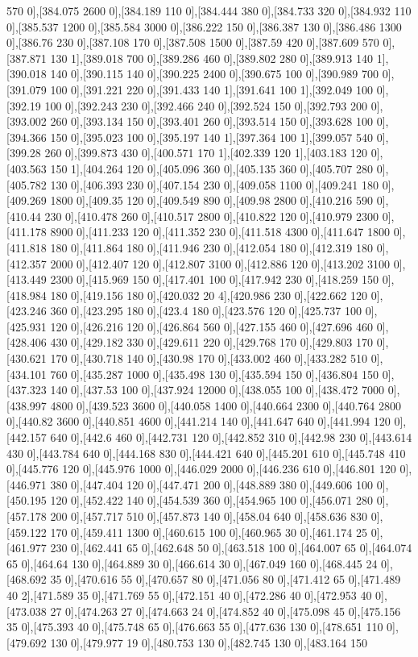 {570 0],[384.075 2600 0],[384.189 110 0],[384.444 380 0],[384.733 320 0],[384.932 110 0],[385.537 1200 0],[385.584 3000 0],[386.222 150 0],[386.387 130 0],[386.486 1300 0],[386.76 230 0],[387.108 170 0],[387.508 1500 0],[387.59 420 0],[387.609 570 0],[387.871 130 1],[389.018 700 0],[389.286 460 0],[389.802 280 0],[389.913 140 1],[390.018 140 0],[390.115 140 0],[390.225 2400 0],[390.675 100 0],[390.989 700 0],[391.079 100 0],[391.221 220 0],[391.433 140 1],[391.641 100 1],[392.049 100 0],[392.19 100 0],[392.243 230 0],[392.466 240 0],[392.524 150 0],[392.793 200 0],[393.002 260 0],[393.134 150 0],[393.401 260 0],[393.514 150 0],[393.628 100 0],[394.366 150 0],[395.023 100 0],[395.197 140 1],[397.364 100 1],[399.057 540 0],[399.28 260 0],[399.873 430 0],[400.571 170 1],[402.339 120 1],[403.183 120 0],[403.563 150 1],[404.264 120 0],[405.096 360 0],[405.135 360 0],[405.707 280 0],[405.782 130 0],[406.393 230 0],[407.154 230 0],[409.058 1100 0],[409.241 180 0],[409.269 1800 0],[409.35 120 0],[409.549 890 0],[409.98 2800 0],[410.216 590 0],[410.44 230 0],[410.478 260 0],[410.517 2800 0],[410.822 120 0],[410.979 2300 0],[411.178 8900 0],[411.233 120 0],[411.352 230 0],[411.518 4300 0],[411.647 1800 0],[411.818 180 0],[411.864 180 0],[411.946 230 0],[412.054 180 0],[412.319 180 0],[412.357 2000 0],[412.407 120 0],[412.807 3100 0],[412.886 120 0],[413.202 3100 0],[413.449 2300 0],[415.969 150 0],[417.401 100 0],[417.942 230 0],[418.259 150 0],[418.984 180 0],[419.156 180 0],[420.032 20 4],[420.986 230 0],[422.662 120 0],[423.246 360 0],[423.295 180 0],[423.4 180 0],[423.576 120 0],[425.737 100 0],[425.931 120 0],[426.216 120 0],[426.864 560 0],[427.155 460 0],[427.696 460 0],[428.406 430 0],[429.182 330 0],[429.611 220 0],[429.768 170 0],[429.803 170 0],[430.621 170 0],[430.718 140 0],[430.98 170 0],[433.002 460 0],[433.282 510 0],[434.101 760 0],[435.287 1000 0],[435.498 130 0],[435.594 150 0],[436.804 150 0],[437.323 140 0],[437.53 100 0],[437.924 12000 0],[438.055 100 0],[438.472 7000 0],[438.997 4800 0],[439.523 3600 0],[440.058 1400 0],[440.664 2300 0],[440.764 2800 0],[440.82 3600 0],[440.851 4600 0],[441.214 140 0],[441.647 640 0],[441.994 120 0],[442.157 640 0],[442.6 460 0],[442.731 120 0],[442.852 310 0],[442.98 230 0],[443.614 430 0],[443.784 640 0],[444.168 830 0],[444.421 640 0],[445.201 610 0],[445.748 410 0],[445.776 120 0],[445.976 1000 0],[446.029 2000 0],[446.236 610 0],[446.801 120 0],[446.971 380 0],[447.404 120 0],[447.471 200 0],[448.889 380 0],[449.606 100 0],[450.195 120 0],[452.422 140 0],[454.539 360 0],[454.965 100 0],[456.071 280 0],[457.178 200 0],[457.717 510 0],[457.873 140 0],[458.04 640 0],[458.636 830 0],[459.122 170 0],[459.411 1300 0],[460.615 100 0],[460.965 30 0],[461.174 25 0],[461.977 230 0],[462.441 65 0],[462.648 50 0],[463.518 100 0],[464.007 65 0],[464.074 65 0],[464.64 130 0],[464.889 30 0],[466.614 30 0],[467.049 160 0],[468.445 24 0],[468.692 35 0],[470.616 55 0],[470.657 80 0],[471.056 80 0],[471.412 65 0],[471.489 40 2],[471.589 35 0],[471.769 55 0],[472.151 40 0],[472.286 40 0],[472.953 40 0],[473.038 27 0],[474.263 27 0],[474.663 24 0],[474.852 40 0],[475.098 45 0],[475.156 35 0],[475.393 40 0],[475.748 65 0],[476.663 55 0],[477.636 130 0],[478.651 110 0],[479.692 130 0],[479.977 19 0],[480.753 130 0],[482.745 130 0],[483.164 150 }
